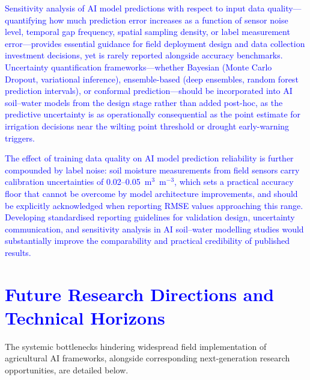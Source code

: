 \documentclass[land,article,submit,pdftex,moreauthors]{Definitions/mdpi}
\numberwithin{equation}{section}
\begin{document}
\textcolor{blue}{Sensitivity analysis of AI model predictions with respect to input data quality---quantifying how much prediction error increases as a function of sensor noise level, temporal gap frequency, spatial sampling density, or label measurement error---provides essential guidance for field deployment design and data collection investment decisions, yet is rarely reported alongside accuracy benchmarks. Uncertainty quantification frameworks---whether Bayesian (Monte Carlo Dropout, variational inference), ensemble-based (deep ensembles, random forest prediction intervals), or conformal prediction---should be incorporated into AI soil--water models from the design stage rather than added post-hoc, as the predictive uncertainty is as operationally consequential as the point estimate for irrigation decisions near the wilting point threshold or drought early-warning triggers.} 

\textcolor{blue}{The effect of training data quality on AI model prediction reliability is further compounded by label noise: soil moisture measurements from field sensors carry calibration uncertainties of 0.02--0.05~m$^3$~m$^{-3}$, which sets a practical accuracy floor that cannot be overcome by model architecture improvements, and should be explicitly acknowledged when reporting RMSE values approaching this range. Developing standardised reporting guidelines for validation design, uncertainty communication, and sensitivity analysis in AI soil--water modelling studies would substantially improve the comparability and practical credibility of published results.}

\section{\textcolor{blue}{Future Research Directions and Technical Horizons}}

The systemic bottlenecks hindering widespread field implementation of agricultural AI frameworks, alongside corresponding next-generation research opportunities, are detailed below.
\end{document}
